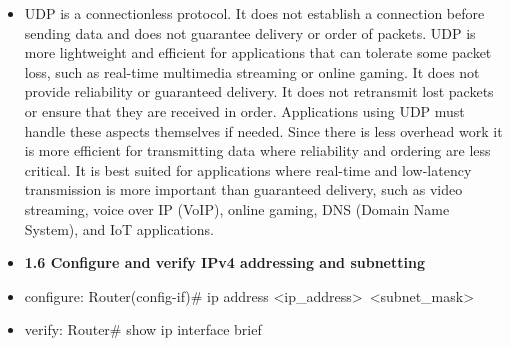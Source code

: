 \documentclass{article}
\begin{document}
\begin{itemize}
  	\item[] UDP is a connectionless protocol. It does not establish a connection before sending data and does not guarantee delivery or order of packets. UDP is more lightweight and efficient for applications that can tolerate some packet loss, such as real-time multimedia streaming or online gaming. It does not provide reliability or guaranteed delivery. It does not retransmit lost packets or ensure that they are received in order. Applications using UDP must handle these aspects themselves if needed. Since there is less overhead work it is more efficient for transmitting data where reliability and ordering are less critical. It is best suited for applications where real-time and low-latency transmission is more important than guaranteed delivery, such as video streaming, voice over IP (VoIP), online gaming, DNS (Domain Name System), and IoT applications.
  	
  
  \item \textbf{1.6 Configure and verify IPv4 addressing and subnetting}
  	\item[] configure: Router(config-if)\# ip address \textless ip\_address\textgreater\ \textless subnet\_mask\textgreater
  	\item[] verify: Router\# show ip interface brief
  

\end{itemize}
\end{document}
